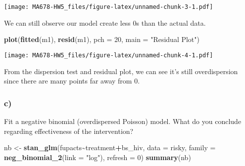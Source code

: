 \documentclass[
]{article}
\newenvironment{Shaded}{\begin{snugshade}}{\end{snugshade}}
\newcommand{\AttributeTok}[1]{\textcolor[rgb]{0.13,0.29,0.53}{#1}}
\newcommand{\DecValTok}[1]{\textcolor[rgb]{0.00,0.00,0.81}{#1}}
\newcommand{\FunctionTok}[1]{\textcolor[rgb]{0.13,0.29,0.53}{\textbf{#1}}}
\newcommand{\NormalTok}[1]{#1}
\newcommand{\OtherTok}[1]{\textcolor[rgb]{0.56,0.35,0.01}{#1}}
\newcommand{\SpecialCharTok}[1]{\textcolor[rgb]{0.81,0.36,0.00}{\textbf{#1}}}
\newcommand{\StringTok}[1]{\textcolor[rgb]{0.31,0.60,0.02}{#1}}
\begin{document}
\texttt{[image: MA678-HW5\_files/figure-latex/unnamed-chunk-3-1.pdf]}

We can still observe our model create less 0s than the actual data.

\begin{Shaded}
\begin{Highlighting}[]
\FunctionTok{plot}\NormalTok{(}\FunctionTok{fitted}\NormalTok{(m1), }\FunctionTok{resid}\NormalTok{(m1), }\AttributeTok{pch =} \DecValTok{20}\NormalTok{, }\AttributeTok{main =} \StringTok{"Residual Plot"}\NormalTok{)}
\end{Highlighting}
\end{Shaded}

\texttt{[image: MA678-HW5\_files/figure-latex/unnamed-chunk-4-1.pdf]}

From the dispersion test and residual plot, we can see it's still
overdispersion since there are many points far away from 0.

\hypertarget{c}{%
\subsubsection{c)}\label{c}}

Fit a negative binomial (overdispersed Poisson) model. What do you
conclude regarding effectiveness of the intervention?

\begin{Shaded}
\begin{Highlighting}[]
\NormalTok{nb }\OtherTok{\textless{}{-}} \FunctionTok{stan\_glm}\NormalTok{(fupacts}\SpecialCharTok{\textasciitilde{}}\NormalTok{treatment}\SpecialCharTok{+}\NormalTok{bs\_hiv, }\AttributeTok{data =}\NormalTok{ risky, }
               \AttributeTok{family =} \FunctionTok{neg\_binomial\_2}\NormalTok{(}\AttributeTok{link =} \StringTok{"log"}\NormalTok{), }\AttributeTok{refresh =} \DecValTok{0}\NormalTok{)}
\FunctionTok{summary}\NormalTok{(nb)}
\end{Highlighting}
\end{Shaded}
\end{document}
